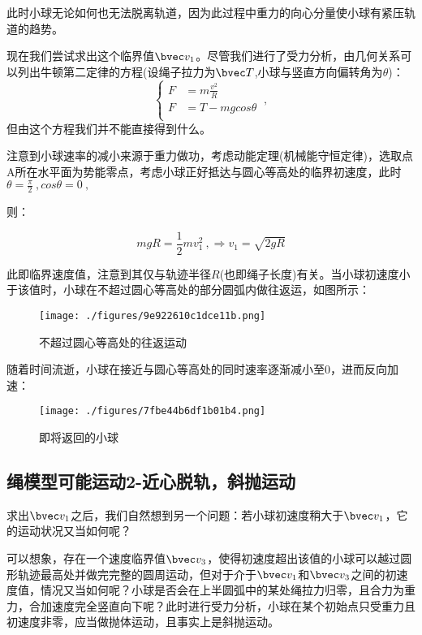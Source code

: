 此时小球无论如何也无法脱离轨道，因为此过程中重力的向心分量使小球有紧压轨道的趋势。

现在我们尝试求出这个临界值$\bvec v_1$。尽管我们进行了受力分析，由几何关系可以列出牛顿第二定律的方程(设绳子拉力为$\bvec T$,小球与竖直方向偏转角为$\theta$)：
$$
\left \{
\begin{aligned}
F&=m\frac{v^2}{R}\\
F&=T-mg cos \theta \\
\end{aligned}
\right.
~,
$$
但由这个方程我们并不能直接得到什么。

注意到小球速率的减小来源于重力做功，考虑动能定理(机械能守恒定律)，选取点A所在水平面为势能零点，考虑小球正好抵达与圆心等高处的临界初速度，此时
$\theta=\frac{\pi }{2}~, cos \theta=0~,$

则：

\begin{equation}
mgR = \frac12 mv_1^2 ~,
\Rightarrow 
v_1=\sqrt{2gR}
\end{equation}

此即临界速度值，注意到其仅与轨迹半径$R$(也即绳子长度)有关。当小球初速度小于该值时，小球在不超过圆心等高处的部分圆弧内做往返运，如图所示：
\begin{figure}[ht]
\centering
\texttt{[image: ./figures/9e922610c1dce11b.png]}
\caption{不超过圆心等高处的往返运动} \label{fig_CirVer_2}
\end{figure}

随着时间流逝，小球在接近与圆心等高处的同时速率逐渐减小至0，进而反向加速：

\begin{figure}[ht]
\centering
\texttt{[image: ./figures/7fbe44b6df1b01b4.png]}
\caption{即将返回的小球} \label{fig_CirVer_1}
\end{figure}

\subsection{绳模型可能运动2-近心脱轨，斜抛运动}
求出$\bvec v_1$之后，我们自然想到另一个问题：若小球初速度稍大于$\bvec v_1$，它的运动状况又当如何呢？

可以想象，存在一个速度临界值$\bvec v_3$，使得初速度超出该值的小球可以越过圆形轨迹最高处并做完完整的圆周运动，但对于介于$\bvec v_1$和$\bvec v_3$之间的初速度值，情况又当如何呢？小球是否会在上半圆弧中的某处绳拉力归零，且合力为重力，合加速度完全竖直向下呢？此时进行受力分析，小球在某个初始点只受重力且初速度非零，应当做抛体运动，且事实上是斜抛运动。

